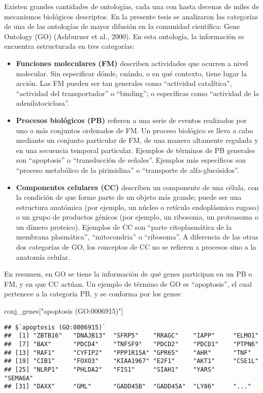 \documentclass[12pt,twoside]{reedthesis}
\newenvironment{Shaded}{\begin{snugshade}}{\end{snugshade}}
\newcommand{\NormalTok}[1]{#1}
\newcommand{\StringTok}[1]{\textcolor[rgb]{0.31,0.60,0.02}{#1}}
\begin{document}
Existen grandes cantidades de ontologías, cada una con hasta decenas de miles de mecanismos biológicos descriptos. En la presente tesis se analizaron las categorías de una de las ontologías de mayor difusión en la comunidad científica: Gene Ontology (GO) (Ashburner et al., 2000). En esta ontología, la información se encuentra estructurada en tres categorías:
\begin{itemize}
\item
  \textbf{Funciones moleculares (FM)} describen actividades que ocurren a nivel molecular. Sin especificar dónde, cuándo, o en qué contexto, tiene lugar la acción. Las FM pueden ser tan generales como ``actividad catalítica'', ``actividad del transportador'' o ``binding''; o específicas como ``actividad de la adenilatociclasa''.
\item
  \textbf{Procesos biológicos (PB)} refieren a una serie de eventos realizados por uno o más conjuntos ordenados de FM. Un proceso biológico se lleva a cabo mediante un conjunto particular de FM, de una manera altamente regulada y en una secuencia temporal particular. Ejemplos de términos de PB generales son ``apoptosis'' o ``transducción de señales''. Ejemplos más específicos son ``proceso metabólico de la pirimidina'' o ``transporte de alfa-glucósidos''.
\item
  \textbf{Componentes celulares (CC)} describen un componente de una célula, con la condición de que forme parte de un objeto más grande; puede ser una estructura anatómica (por ejemplo, un núcleo o retículo endoplásmico rugoso) o un grupo de productos génicos (por ejemplo, un ribosoma, un proteasoma o un dímero proteico). Ejemplos de CC son ``parte citoplasmática de la membrana plasmática'', ``mitocondria'' o ``ribosoma''. A diferencia de las otras dos categorías de GO, los conceptos de CC no se refieren a procesos sino a la anatomía celular.
\end{itemize}
En resumen, en GO se tiene la información de qué genes participan en un PB o FM, y en que CC actúan. Un ejemplo de término de GO es ``apoptosis'', el cual pertenece a la categoría PB, y se conforma por los genes:
\begin{Shaded}
\begin{Highlighting}[]
\NormalTok{conj_genes[}\StringTok{"apoptosis (GO:0006915)"}\NormalTok{]}
\end{Highlighting}
\end{Shaded}
\begin{verbatim}
## $`apoptosis (GO:0006915)`
##  [1] "ZBTB16"   "DNAJB13"  "SFRP5"    "RRAGC"    "IAPP"     "ELMO1"   
##  [7] "BAX"      "PDCD4"    "TNFSF9"   "PDCD2"    "PDCD1"    "PTPN6"   
## [13] "RAF1"     "CYFIP2"   "PPP1R15A" "GPR65"    "AHR"      "TNF"     
## [19] "CIB1"     "FOXO3"    "KIAA1967" "E2F1"     "AKT1"     "CSE1L"   
## [25] "NLRP1"    "PHLDA2"   "FIS1"     "SIAH1"    "YARS"     "SEMA6A"  
## [31] "DAXX"     "GML"      "GADD45B"  "GADD45A"  "LY86"     "..."
\end{verbatim}
\end{document}
